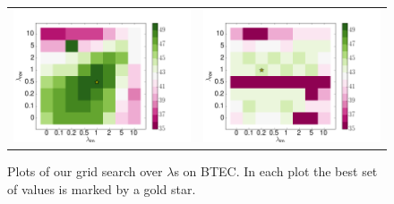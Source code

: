 \documentclass[11pt,a4paper]{article}
\begin{document}
\begin{figure}
\begin{tabular}{c c}
\includegraphics[scale=0.36]{0_5.png} & \includegraphics[scale=0.36]{10.png} \\
\end{tabular}
\caption{Plots of our grid search over $\lambda$s on BTEC. In each plot the best set of values is marked by a gold star.}
\label{fig:grid_search}
\end{figure}
\end{document}
